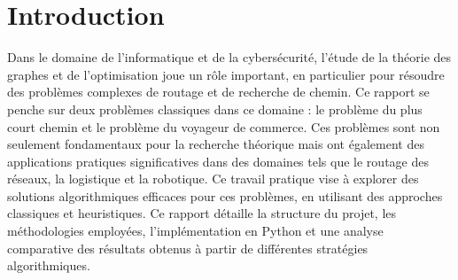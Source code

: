 \chapter{Introduction}
\label{chap:introduction}
Dans le domaine de l'informatique et de la cybersécurité, l'étude de la théorie des graphes et de l'optimisation joue un rôle important, en particulier pour résoudre des problèmes complexes de routage et de recherche de chemin. Ce rapport se penche sur deux problèmes classiques dans ce domaine : le problème du plus court chemin et le problème du voyageur de commerce. Ces problèmes sont non seulement fondamentaux pour la recherche théorique mais ont également des applications pratiques significatives dans des domaines tels que le routage des réseaux, la logistique et la robotique. Ce travail pratique vise à explorer des solutions algorithmiques efficaces pour ces problèmes, en utilisant des approches classiques et heuristiques. Ce rapport détaille la structure du projet, les méthodologies employées, l'implémentation en Python et une analyse comparative des résultats obtenus à partir de différentes stratégies algorithmiques.